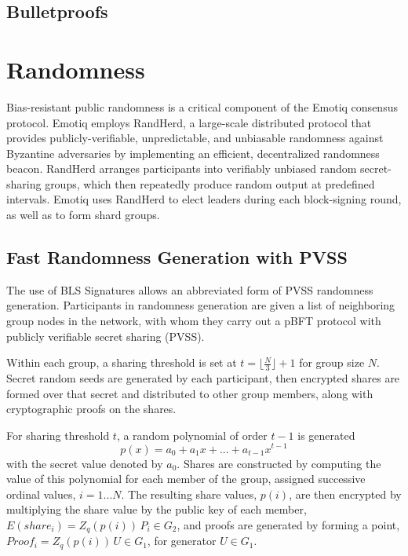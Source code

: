\documentclass{yellowpaper}
\begin{document}
\subsection{Bulletproofs}

\section{Randomness}
Bias-resistant public randomness is a critical component of the Emotiq consensus protocol. Emotiq employs RandHerd, a large-scale distributed protocol that provides publicly-verifiable, unpredictable, and unbiasable randomness against Byzantine adversaries by implementing an efficient, decentralized randomness beacon. RandHerd arranges participants into verifiably unbiased random
secret-sharing groups, which then repeatedly produce random output at predefined intervals. Emotiq uses RandHerd to elect leaders during each block-signing round, as well as to form shard groups.
\subsection{Fast Randomness Generation with PVSS}

The use of BLS Signatures allows an abbreviated form of PVSS randomness generation. Participants in randomness generation are given a list of neighboring group nodes in the network, with whom they carry out a pBFT protocol with publicly verifiable secret sharing (PVSS). 

Within each group, a sharing threshold is set at $t = \lfloor \frac{N}{3} \rfloor + 1$ for group size $N$. Secret random seeds are generated by each participant, then encrypted shares are formed over that secret and distributed to other group members, along with cryptographic proofs on the shares.

For sharing threshold $t$, a random polynomial of order $t-1$ is generated $$p(x) = a_0 + a_1 x + ... + a_{t-1} x^{t-1}$$ with the secret value denoted by $a_0$.  Shares are constructed by computing the value of this polynomial for each member of the group, assigned successive ordinal values, $i = 1 ... N$. The resulting share values, $p(i)$, are then encrypted by multiplying the share value by the public key of each member, $E(share_i) = Z_q(p(i))\, P_i \in G_2$, and proofs are generated by forming a point, $Proof_i = Z_q(p(i)) \,U \in G_1$, for generator $U \in G_1$. 
\end{document}
